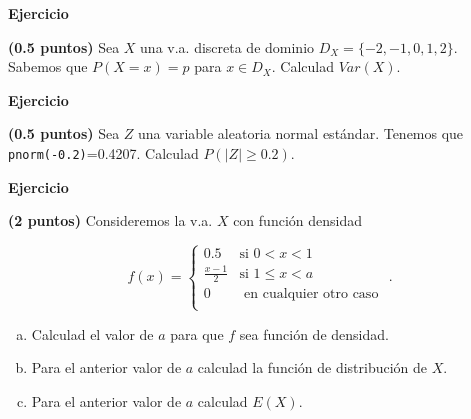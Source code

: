 \documentclass[12pt,spanish,es-nodecimaldot]{article}\usepackage[]{graphicx}\usepackage[]{color}
\newcounter{problemes}
\newcounter{punts} \def\thepunts{\arabic{punts}}
\def\probl{\textbf{\newline\noindent\hspace{-1cm} Ejercicio}\addtocounter{problemes}{1} \setcounter{punts}{0}
\medskip\noindent{\bf \theproblemes) }}
\newif\ifsol
\begin{document}
\probl  \textbf{(0.5 puntos)} 
Sea $X$ una v.a. discreta de dominio $D_X=\{-2,-1,0,1,2\}$. Sabemos que $P(X=x)=p$ para $x\in D_X$.
Calculad $Var(X)$.

\ifsol
\textbf{Solución:}

\sl

$\frac{2}{5}.$
\else

\fi


\probl  \textbf{(0.5 puntos)} 
Sea $Z$ una variable aleatoria normal estándar.  Tenemos que \texttt{pnorm(-0.2)}=0.4207.
Calculad $P(|Z|\geq 0.2)$.

\ifsol
\textbf{Solución:}

\sl

0.8415.
\else

\fi




\probl \textbf{(2 puntos)}  Consideremos la v.a. $X$ con función densidad


$$f(x)=\left\{
\begin{array}{cl}
 \displaystyle 0.5& \mbox{si } 0< x <1 \\
\displaystyle\frac{x-1}{2} & \mbox{si } 1\leq x < a \\
 \displaystyle 0 & \mbox{ en cualquier otro caso } \\
\end{array}\right..
$$

\begin{enumerate}[a)]
\item Calculad el valor de $a$ para que $f$ sea función de densidad.
\item Para el anterior valor de $a$ calculad la función de distribución de $X$.
\item Para el anterior valor de $a$ calculad $E(X)$.
\end{enumerate}
\end{document}
